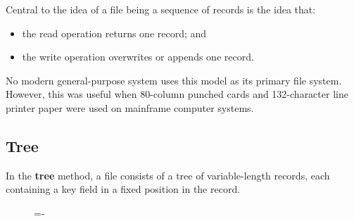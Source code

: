 \documentclass[a4paper]{systems-software}
\begin{document}
\begin{figure}[H]
{\begin{minipage}{\dimexpr \textwidth-2\fboxsep-2\fboxrule}
  \end{minipage}}
\end{figure}

Central to the idea of a file being a sequence of records is the idea that:
\begin{itemize}
	\item the read operation returns one record; and
	\item the write operation overwrites or appends one record.
\end{itemize}

No modern general-purpose system uses this model as its primary file system. However, this was useful when 80-column punched cards and 132-character line printer paper were used on mainframe computer systems.


\subsection*{Tree}

In the \textbf{tree} method, a file consists of a tree of variable-length records, each containing a key field in a fixed position in the record.

\begin{figure}[H]
  \lineskip=-\fboxrule
\end{figure}
\end{document}
